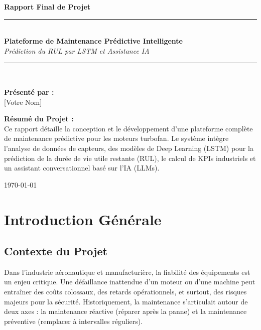 \documentclass[12pt,a4paper]{report}
\begin{document}
\begin{titlepage}
    \centering
    \vspace*{2cm}
    
    {\Large \textbf{Rapport Final de Projet}}\\[1cm]
    
    \rule{\linewidth}{0.5mm} \\[0.4cm]
    {\huge \bfseries Plateforme de Maintenance Prédictive Intelligente}\\[0.2cm]
    {\large \textit{Prédiction du RUL par LSTM et Assistance IA}}
    \rule{\linewidth}{0.5mm} \\[1.5cm]
    
    \vspace{2cm}
    
    \textbf{Présenté par :}\\[0.2cm]
    {\Large [Votre Nom]}\\[1cm]
    
    \vspace{3cm}
    
    \textbf{Résumé du Projet :}\\
    Ce rapport détaille la conception et le développement d'une plateforme complète de maintenance prédictive pour les moteurs turbofan. Le système intègre l'analyse de données de capteurs, des modèles de Deep Learning (LSTM) pour la prédiction de la durée de vie utile restante (RUL), le calcul de KPIs industriels et un assistant conversationnel basé sur l'IA (LLMs).
    
    \vfill
    
    {\large \today}\\[2cm]
\end{titlepage}

\tableofcontents
\listoffigures
\listoftables
\newpage

\onehalfspacing

\chapter{Introduction Générale}
\section{Contexte du Projet}
Dans l'industrie aéronautique et manufacturière, la fiabilité des équipements est un enjeu critique. Une défaillance inattendue d'un moteur ou d'une machine peut entraîner des coûts colossaux, des retards opérationnels, et surtout, des risques majeurs pour la sécurité. Historiquement, la maintenance s'articulait autour de deux axes : la maintenance réactive (réparer après la panne) et la maintenance préventive (remplacer à intervalles réguliers). 
\end{document}
